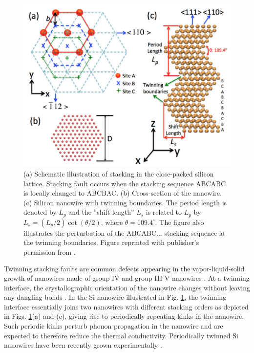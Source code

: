 \begin{figure}[tb]
 \begin{center}
  \includegraphics[width=.89\columnwidth]{pics/twinning_fig1.pdf} 
  \caption{(a) Schematic illustration of stacking in the close-packed silicon lattice. Stacking fault occurs when the stacking sequence ABCABC is locally changed to ABCBAC. (b) Cross-section of the nanowire. (c) Silicon nanowire with twinning boundaries. The period length is denoted by $L_p$ and the ''shift length'' $L_s$ is related to $L_p$ by $L_s=(L_p/2)\cot(\theta/2)$, where $\theta=109.4^{\circ}$. The figure also illustrates the perturbation of the ABCABC... stacking sequence at the twinning boundaries. Figure reprinted with publisher's permission from .}  
\label{fig:twinning_fig1}
 \end{center}
\end{figure}

Twinning stacking faults \cite{cahn54} are common defects appearing in the vapor-liquid-solid growth of nanowires made of group IV and group III-V nanowires \cite{johansson06,xiong06,davidson07,algra08}. At a twinning interface, the crystallographic orientation of the nanowire changes without leaving any dangling bonds \cite{korgel06}. In the Si nanowire illustrated in Fig. \ref{fig:twinning_fig1}, the twinning interface essentially joins two nanowires with different stacking orders as depicted in Figs. \ref{fig:twinning_fig1}(a) and (c), giving rise to periodically repeating kinks in the nanowire. Such periodic kinks perturb phonon propagation in the nanowire and are expected to therefore reduce the thermal conductivity. Periodically twinned Si nanowires have been recently grown experimentally \cite{ruffino15}.

